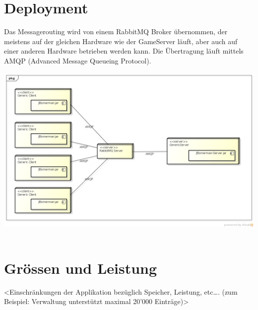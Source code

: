 \documentclass[11pt]{scrartcl}
\begin{document}
\section{Deployment}
Das Messagerouting wird von einem RabbitMQ Broker übernommen, der meistens auf der gleichen Hardware wie der GameServer läuft, aber auch auf einer anderen Hardware betrieben werden kann. Die Übertragung läuft mittels AMQP (Advanced Message Queueing Protocol).

\includegraphics[scale=0.4]{DeploymentDiagram}
 
\newpage


\section{Grössen und Leistung}
<Einschränkungen der Applikation bezüglich Speicher, Leistung, etc…. (zum Beispiel: Verwaltung unterstützt maximal 20'000 Einträge)>
\end{document}
